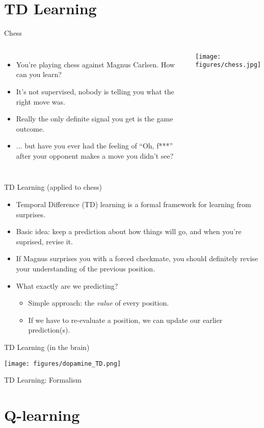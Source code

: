 \documentclass{beamer}
\begin{document}
\section{TD Learning}
\begin{frame}{Chess}
\begin{columns}
\begin{itemize}
    \item<1-> You're playing chess against Magnus Carlsen. How can you learn?
    \item<2-> It's not supervised, nobody is telling you what the right move was.
    \item<3-> Really the only definite signal you get is the game outcome.
    \item<4-> ... but have you ever had the feeling of ``Oh, f***'' after your opponent makes a move you didn't see?
\end{itemize}
    \begin{center}
    \texttt{[image: figures/chess.jpg]}
    \end{center}
\end{columns}
\end{frame}

\begin{frame}{TD Learning (applied to chess)}
\begin{itemize}
    \item<1-> Temporal Difference (TD) learning is a formal framework for learning from surprises. 
    \item<2-> Basic idea: keep a prediction about how things will go, and when you're suprised, revise it. 
    \item<3-> If Magnus surprises you with a forced checkmate, you should definitely revise your understanding of the previous position.
    \item<4-> What exactly are we predicting? 
    \begin{itemize}
        \item<5-> Simple approach: the \emph{value} of every position.
        \item<6-> If we have to re-evaluate a position, we can update our earlier prediction(s).
    \end{itemize}
\end{itemize}
\end{frame}

\begin{frame}{TD Learning (in the brain)}

\begin{center}
\texttt{[image: figures/dopamine\_TD.png]}
\end{center}
\end{frame}

\begin{frame}{TD Learning: Formalism}
\end{frame}

\section{Q-learning}
\end{document}
